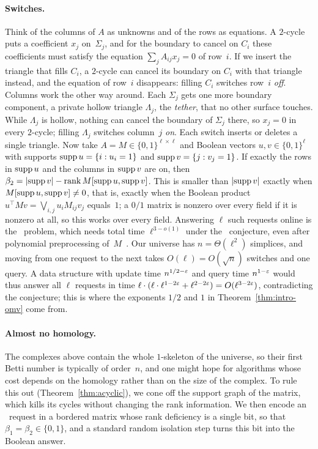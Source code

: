 \paragraph{Switches.}
Think of the columns of $A$ as unknowns and of the rows as equations.
A $2$-cycle puts a coefficient $x_j$ on~$\Sigma_j$, and for the boundary to cancel on $C_i$ these coefficients must satisfy the equation $\sum_jA_{ij}x_j=0$ of row~$i$.
If we insert the triangle that fills $C_i$, a $2$-cycle can cancel its boundary on $C_i$ with that triangle instead, and the equation of row~$i$ disappears: filling $C_i$ switches row~$i$ \emph{off}.
Columns work the other way around.
Each $\Sigma_j$ gets one more boundary component, a private hollow triangle $\Lambda_j$, the \emph{tether}, that no other surface touches.
While $\Lambda_j$ is hollow, nothing can cancel the boundary of $\Sigma_j$ there, so $x_j=0$ in every $2$-cycle; filling $\Lambda_j$ switches column~$j$ \emph{on}.
Each switch inserts or deletes a single triangle.
Now take $A=M\in\{0,1\}^{\ell\times\ell}$ and Boolean vectors $u,v\in\{0,1\}^{\ell}$ with supports $\operatorname{supp} u=\{i:u_i=1\}$ and $\operatorname{supp} v=\{j:v_j=1\}$.
If exactly the rows in $\operatorname{supp} u$ and the columns in $\operatorname{supp} v$ are on, then $\beta_2=\lvert\operatorname{supp} v\rvert-\operatorname{rank} M[\operatorname{supp} u,\operatorname{supp} v]$.
This is smaller than $\lvert\operatorname{supp} v\rvert$ exactly when $M[\operatorname{supp} u,\operatorname{supp} v]\ne0$, that is, exactly when the Boolean product $u^{\top}Mv=\bigvee_{i,j}u_iM_{ij}v_j$ equals~$1$; a $0/1$ matrix is nonzero over every field if it is nonzero at all, so this works over every field.
Answering $\ell$ such requests online is the \OuMv\ problem, which needs total time $\ell^{3-o(1)}$ under the \OMv\ conjecture, even after polynomial preprocessing of~$M$~\cite{HKNS15}.
Our universe has $n=\Theta(\ell^2)$ simplices, and moving from one request to the next takes $O(\ell)=O(\sqrt n)$ switches and one query.
A data structure with update time $n^{1/2-\varepsilon}$ and query time $n^{1-\varepsilon}$ would thus answer all $\ell$ requests in time $\ell\cdot(\ell\cdot\ell^{1-2\varepsilon}+\ell^{2-2\varepsilon})=O(\ell^{3-2\varepsilon})$, contradicting the conjecture; this is where the exponents $1/2$ and $1$ in Theorem~\ref{thm:intro-omv} come from.

\paragraph{Almost no homology.}
The complexes above contain the whole $1$-skeleton of the universe, so their first Betti number is typically of order~$n$, and one might hope for algorithms whose cost depends on the homology rather than on the size of the complex.
To rule this out (Theorem~\ref{thm:acyclic}), we cone off the support graph of the matrix, which kills its cycles without changing the rank information.
We then encode an \OuMv\ request in a bordered matrix whose rank deficiency is a single bit, so that $\beta_1=\beta_2\in\{0,1\}$, and a standard random isolation step turns this bit into the Boolean answer.

